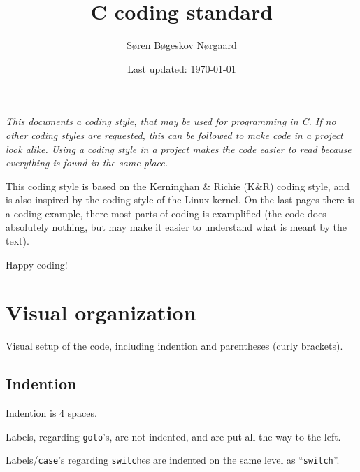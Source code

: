 \documentclass[article, 10pt]{memoir}
\title{C coding standard}
\author{Søren Bøgeskov Nørgaard}
\date{Last updated: \today}
\let\tempone\itemize
\let\temptwo\enditemize
\renewenvironment{itemize}{\tempone\firmlist}{\temptwo}
\begin{document}
\maketitle
\begin{multicols}{2}

    {
        \itshape
        This documents a coding style, that may be used for programming in C. If no other coding styles are requested, this can be followed to make code in a project look alike. Using a coding style in  a project makes the code easier to read because everything is found in the same place.


        This coding style is based on the Kerninghan \& Richie (K\&R) coding style, and is also inspired by the coding style of the Linux kernel. On the last pages there is a coding example, there most parts of coding is examplified (the code does absolutely nothing, but may make it easier to understand what is meant by the text).

        Happy coding!
    }
    \tableofcontents

    \chapter{Visual organization}
    Visual setup of the code, including indention and parentheses (curly brackets).

    \section{Indention}
    \begin{itemize}
    \item Indention is 4 spaces.
    \item Labels, regarding \texttt{goto}'s, are not indented, and are put all the way to the left.
    \item Labels/\texttt{case}'s regarding \texttt{switch}es are indented on the same level as ``\texttt{switch}''.
    \end{itemize}


\end{multicols}
\end{document}
